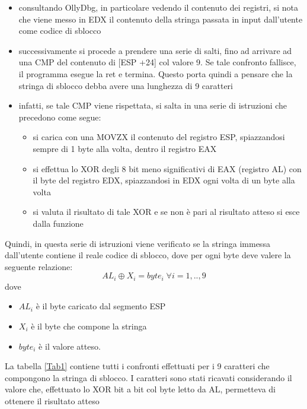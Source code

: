 \documentclass{article}
\begin{document}
\begin{itemize}
\item consultando OllyDbg, in particolare vedendo il contenuto dei registri, si nota che viene messo in EDX il contenuto della stringa passata in input dall'utente come codice di sblocco
\item successivamente si procede a prendere una serie di salti, fino ad arrivare ad una CMP del contenuto di [ESP +24] col valore 9. Se tale confronto fallisce, il programma esegue la ret e termina. Questo porta quindi a pensare che la stringa di sblocco debba avere una lunghezza di 9 caratteri
\item infatti, se tale CMP viene rispettata, si salta in una serie di istruzioni che precedono come segue:
\begin{itemize}
\item si carica con una MOVZX il contenuto del registro ESP, spiazzandosi sempre di 1 byte alla volta, dentro il registro EAX
\item si effettua lo XOR degli 8 bit meno significativi di EAX (registro AL) con il byte del registro EDX, spiazzandosi in EDX ogni volta di un byte alla volta
\item si valuta il risultato di tale XOR e se non è pari al risultato atteso si esce dalla funzione
\end{itemize}
\end{itemize}
Quindi, in questa serie di istruzioni viene verificato se la stringa immessa dall'utente contiene il reale codice di sblocco, dove per ogni byte deve valere la seguente relazione:
\begin{equation}
AL_i \oplus X_i = byte_i \; \forall i = 1,..,9
\end{equation}
dove 
\begin{itemize}
\item $AL_i$ è il byte caricato dal segmento ESP
\item $X_i$ è il byte che compone la stringa 
\item $byte_i$ è il valore atteso.
\end{itemize}
La tabella \ref{Tab1} contiene tutti i confronti effettuati per i 9 caratteri che compongono la stringa di sblocco. I caratteri sono stati ricavati considerando il valore che, effettuato lo XOR bit a bit col byte letto da AL, permetteva di ottenere il risultato atteso
\end{document}
